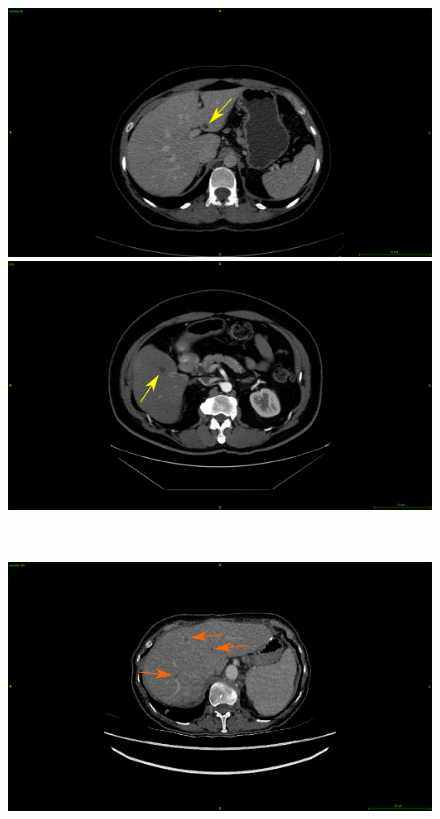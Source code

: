 \documentclass[]{article}
\begin{document}
\begin{figure}[!ht]
	\centering
	\begin{minipage}{0.45\linewidth}
		\includegraphics[width=\linewidth]{../Contributions/images/Artifacts/ResizeLITS_cyst}
	\end{minipage} \hspace{-0.1cm}
	\begin{minipage}{0.45\linewidth}
		\includegraphics[width=\linewidth]{../Contributions/images/Artifacts/ResizeTCIA_cyst}
	\end{minipage} \\
	\begin{minipage}{0.45\linewidth}
		\includegraphics[width=\linewidth]{../Contributions/images/Artifacts/ResizeLITS_fat}

\end{minipage}
\end{figure}
\end{document}
